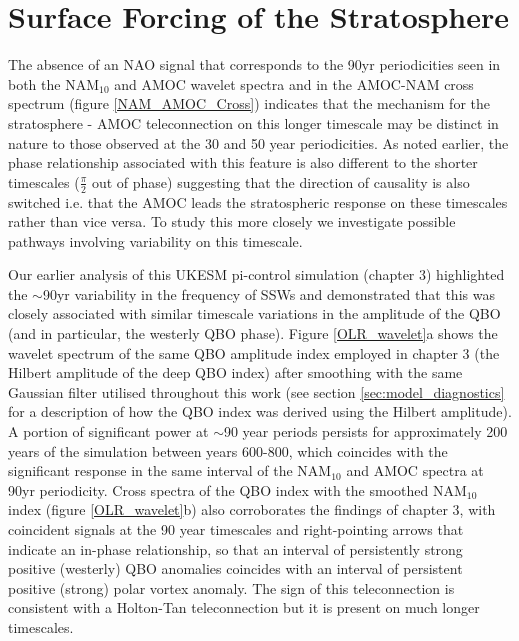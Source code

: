 \section{Surface Forcing of the Stratosphere}\label{surface-strat_forcing}
The absence of an NAO signal that corresponds to the 90yr periodicities seen in both the NAM$_{10}$ and AMOC wavelet spectra and in the  AMOC-NAM cross spectrum (figure \ref{NAM_AMOC_Cross}) indicates that the mechanism for the stratosphere - AMOC teleconnection on this longer timescale may be distinct in nature to those observed at the 30 and 50 year periodicities. As noted earlier, the phase relationship associated with this feature is also different to the shorter timescales ($\frac{\pi}{2}$ out of phase) suggesting that the direction of causality is also switched i.e. that the AMOC leads the stratospheric response on these timescales rather than vice versa. To study this more closely we investigate possible pathways involving variability on this timescale.

Our earlier analysis of this UKESM pi-control simulation (chapter 3) highlighted the $\sim$90yr variability in the frequency of SSWs and demonstrated that this was closely associated with similar timescale variations in the amplitude of the QBO (and in particular, the westerly QBO phase). Figure \ref{OLR_wavelet}a shows the wavelet spectrum of the same QBO amplitude index employed in chapter 3 (the Hilbert amplitude of the deep QBO index) after smoothing with the same Gaussian filter utilised throughout this work (see section \ref{sec:model_diagnostics} for a description of how the QBO index was derived using the Hilbert amplitude). A portion of significant power at $\sim$90 year periods persists for approximately 200 years of the simulation between years 600-800, which coincides with the significant response in the same interval of the NAM$_{10}$ and AMOC spectra at 90yr periodicity. Cross spectra of the QBO index with the smoothed NAM$_{10}$ index (figure \ref{OLR_wavelet}b) also corroborates the findings of chapter 3, with coincident signals at the 90 year timescales and right-pointing arrows that indicate an in-phase relationship, so that an interval of persistently strong positive (westerly) QBO anomalies coincides with an interval of persistent positive (strong) polar vortex anomaly. The sign of this teleconnection is consistent with a Holton-Tan teleconnection \citep{luDecadalscale2008c, luMechanisms2014c} but it is present on much longer timescales. 

